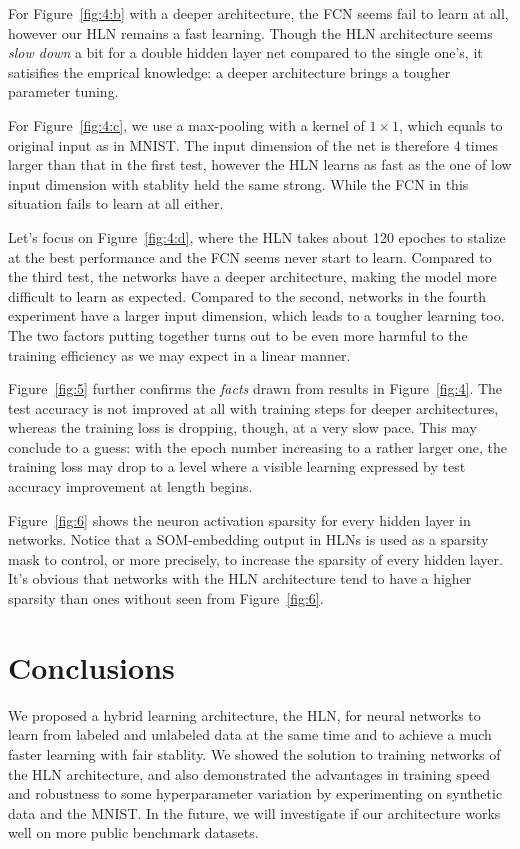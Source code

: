 \documentclass[3p,times,procedia]{elsarticle}
\begin{document}
For Figure~\ref{fig:4:b} with a deeper architecture,
the FCN seems fail to learn at all, however our
HLN remains a fast learning. Though the HLN 
architecture seems \emph{slow down} a bit for
a double hidden layer net compared to the single
one's, it satisifies the emprical knowledge: a deeper
architecture brings a tougher parameter tuning.

For Figure~\ref{fig:4:c}, 
we use a max-pooling with a kernel of $1\times 1$,
which equals to original input as in MNIST.
The input dimension of the net is therefore 4 
times larger than that in the first test, however
the HLN learns as fast as the one of low input
dimension with stablity held the same strong.
While the FCN in this situation fails to learn at
all either.

Let's focus on  
Figure~\ref{fig:4:d}, where the HLN takes about 120
epoches to stalize at the best performance and
the FCN seems never start to learn.
Compared to the third test, the networks have a
deeper architecture, making the model more difficult
to learn as expected.  Compared to the second, 
networks in the fourth experiment
have a larger input dimension, which leads to a
tougher learning too. The two factors putting 
together turns out to be even more harmful to
the training efficiency as we may expect in a
linear manner.

Figure~\ref{fig:5} further confirms the 
\emph{facts} 
drawn from results in Figure~\ref{fig:4}.
The test accuracy is not improved at all
with training steps for deeper architectures,
whereas the training loss is dropping, though,
at a very slow pace. This may conclude to a guess:
with the epoch number increasing to a rather larger
one, the training loss may drop to a level where
a visible learning expressed by test accuracy 
improvement at length begins.

Figure~\ref{fig:6} shows the neuron activation
sparsity for every hidden layer in networks.
Notice that a SOM-embedding output in HLNs
is used as a sparsity mask to control, or more
precisely, to increase the sparsity of every
hidden layer. It's obvious that networks with 
the HLN architecture tend to have a higher 
sparsity than ones without seen from 
Figure~\ref{fig:6}.

\section{Conclusions}
We proposed a hybrid learning architecture,
the HLN, for neural networks to learn from
labeled and unlabeled data at the same time
and to achieve a much faster learning with
fair stablity.
We showed the solution to training networks of
the HLN architecture, and also demonstrated 
the advantages in training speed and robustness
to some hyperparameter variation by experimenting
on synthetic data and the MNIST. In the future,
we will investigate if our architecture works well
on more public benchmark datasets.
\end{document}
